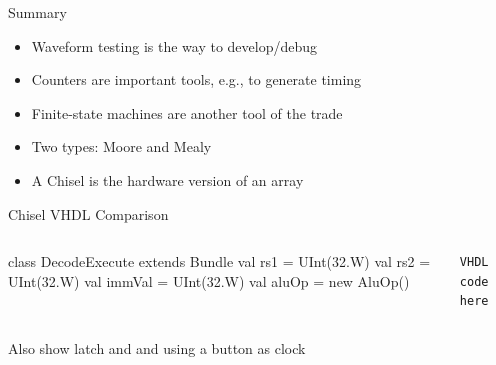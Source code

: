\begin{frame}[fragile]{Summary}
\begin{itemize}
\item Waveform testing is the way to develop/debug
\item Counters are important tools, e.g., to generate timing
\item Finite-state machines are another tool of the trade
\item Two types: Moore and Mealy
\item A Chisel  is the hardware version of an array
\end{itemize}
\end{frame}


\begin{frame}[fragile]{Chisel VHDL Comparison}
\begin{columns}
\begin{chisel}
class DecodeExecute extends Bundle {
  val rs1 = UInt(32.W)
  val rs2 = UInt(32.W)
  val immVal = UInt(32.W)
  val aluOp = new AluOp()
}
\end{chisel}
\begin{verbatim}
VHDL code here
\end{verbatim}
\end{columns}
Also show latch and and using a button as clock
\end{frame}






